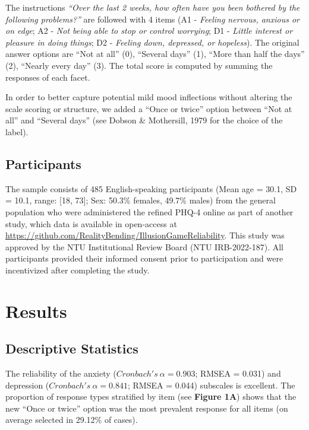 \documentclass[
  man,floatsintext]{apa6}
\begin{document}
The instructions \emph{``Over the last 2 weeks, how often have you been bothered by the following problems?''} are followed with 4 items (A1 - \emph{Feeling nervous, anxious or on edge}; A2 - \emph{Not being able to stop or control worrying}; D1 - \emph{Little interest or pleasure in doing things}; D2 - \emph{Feeling down, depressed, or hopeless}). The original answer options are ``Not at all'' (0), ``Several days'' (1), ``More than half the days'' (2), ``Nearly every day'' (3). The total score is computed by summing the responses of each facet.

In order to better capture potential mild mood inflections without altering the scale scoring or structure, we added a ``Once or twice'' option between ``Not at all'' and ``Several days'' (see Dobson \& Mothersill, 1979 for the choice of the label).

\hypertarget{participants}{%
\subsection{Participants}\label{participants}}

The sample consists of 485 English-speaking participants (Mean age = 30.1, SD = 10.1, range: {[}18, 73{]}; Sex: 50.3\% females, 49.7\% males) from the general population who were administered the refined PHQ-4 online as part of another study, which data is available in open-access at \url{https://github.com/RealityBending/IllusionGameReliability}. This study was approved by the NTU Institutional Review Board (NTU IRB-2022-187). All participants provided their informed consent prior to participation and were incentivized after completing the study.

\hypertarget{results}{%
\section{Results}\label{results}}

\hypertarget{descriptive-statistics}{%
\subsection{Descriptive Statistics}\label{descriptive-statistics}}

The reliability of the anxiety (\(Cronbach's~\alpha = 0.903\); RMSEA = 0.031) and depression (\(Cronbach's~\alpha = 0.841\); RMSEA = 0.044) subscales is excellent. The proportion of response types stratified by item (see \textbf{Figure 1A}) shows that the new ``Once or twice'' option was the most prevalent response for all items (on average selected in 29.12\% of cases).
\end{document}
